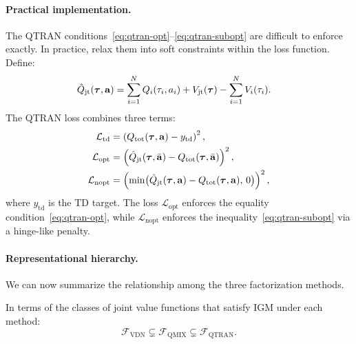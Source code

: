 \documentclass[11pt,a4paper]{article}
\begin{document}
\paragraph{Practical implementation.}
The QTRAN conditions~\eqref{eq:qtran-opt}--\eqref{eq:qtran-subopt}
are difficult to enforce exactly.  In practice, \citet{son2019}
relax them into soft constraints within the loss function.  Define:
\begin{align*}
  \hat{Q}_{\mathrm{jt}}(\boldsymbol{\tau}, \mathbf{a})
  &= \sum_{i=1}^N Q_i(\tau_i, a_i)
     + V_{\mathrm{jt}}(\boldsymbol{\tau})
     - \sum_{i=1}^N V_i(\tau_i).
\end{align*}
The QTRAN loss combines three terms:
\begin{align}
  \mathcal{L}_{\mathrm{td}} &= \left(
    Q_{\mathrm{tot}}(\boldsymbol{\tau}, \mathbf{a})
    - y_{\mathrm{td}}
  \right)^2,
    \label{eq:qtran-loss-td} \\
  \mathcal{L}_{\mathrm{opt}} &= \left(
    \hat{Q}_{\mathrm{jt}}(\boldsymbol{\tau}, \bar{\mathbf{a}})
    - Q_{\mathrm{tot}}(\boldsymbol{\tau}, \bar{\mathbf{a}})
  \right)^2,
    \label{eq:qtran-loss-opt} \\
  \mathcal{L}_{\mathrm{nopt}} &= \left(
    \min\!\big(\hat{Q}_{\mathrm{jt}}(\boldsymbol{\tau}, \mathbf{a})
    - Q_{\mathrm{tot}}(\boldsymbol{\tau}, \mathbf{a}),\, 0\big)
  \right)^2,
    \label{eq:qtran-loss-nopt}
\end{align}
where $y_{\mathrm{td}}$ is the TD target.  The loss
$\mathcal{L}_{\mathrm{opt}}$ enforces the equality
condition~\eqref{eq:qtran-opt}, while $\mathcal{L}_{\mathrm{nopt}}$
enforces the inequality~\eqref{eq:qtran-subopt} via a hinge-like
penalty.

\paragraph{Representational hierarchy.}
We can now summarize the relationship among the three factorization
methods.

\begin{proposition}
\label{prop:hierarchy}
In terms of the classes of joint value functions that satisfy IGM
under each method:
\[
  \mathcal{F}_{\mathrm{VDN}} \subsetneq \mathcal{F}_{\mathrm{QMIX}}
  \subsetneq \mathcal{F}_{\mathrm{QTRAN}}.
\]
\end{proposition}
\end{document}
